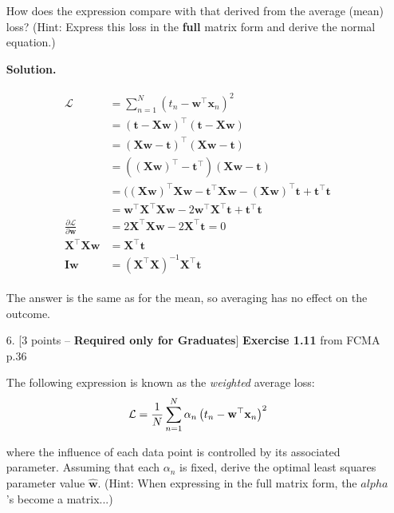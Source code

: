 \documentclass[10pt]{article}
\begin{document}
\begin{itemize}
How does the expression compare with that derived from the average (mean) loss?  (Hint: Express this loss in the {\bf full} matrix form and derive the normal equation.)

{\bf Solution.} 

\begin{eqnarray*}
\begin{aligned}
\mathcal{L} &= \sum_{n=1}^N \left( t_n - \mathbf{w}^\top \mathbf{x}_n \right)^2
\\
&= (\mathbf{t} - \mathbf{X} \mathbf{w})^\top (\mathbf{t} - \mathbf{X} \mathbf{w})
\\
&= (\mathbf{X} \mathbf{w} - \mathbf{t})^\top (\mathbf{X} \mathbf{w} - \mathbf{t})
\\
&= ((\mathbf{X} \mathbf{w})^\top - \mathbf{t}^\top) (\mathbf{X} \mathbf{w} - \mathbf{t})
\\
&= ((\mathbf{X} \mathbf{w})^\top \mathbf{X} \mathbf{w} 
 - \mathbf{t}^\top \mathbf{X} \mathbf{w} 
 - (\mathbf{X} \mathbf{w})^\top \mathbf{t}
 + \mathbf{t}^\top \mathbf{t}
\\
&= \mathbf{w}^\top \mathbf{X}^\top \mathbf{X} \mathbf{w} 
 - 2 \mathbf{w}^\top \mathbf{X}^\top \mathbf{t} 
 + \mathbf{t}^\top \mathbf{t}
\\
\frac { \partial \mathcal{L}} {\partial \mathbf{w}} &=
 2 \mathbf{X}^\top \mathbf{X} \mathbf{w} - 2 \mathbf{X}^\top \mathbf{t} = 0
\\
\mathbf{X}^\top \mathbf{X} \mathbf{w} &= \mathbf{X}^\top \mathbf{t}
\\
\mathbf{I} \mathbf{w} &= (\mathbf{X}^\top \mathbf{X})^{-1} \mathbf{X}^\top \mathbf{t}
\end{aligned}
\end{eqnarray*}

The answer is the same as for the mean, so averaging has no effect on the outcome.

\item[6.] [3 points -- {\bf Required only for Graduates}]
{\bf Exercise 1.11} from FCMA p.36

The following expression is known as the {\em weighted} average loss:
\begin{eqnarray*}
\mathcal{L} = {1 \over N} \sum_{n=1}^N \alpha_n \left( t_n - \mathbf{w}^\top \mathbf{x}_n \right)^2
\end{eqnarray*}

where the influence of each data point is controlled by its associated parameter.  Assuming that each $\alpha_n$ is fixed, derive the optimal least squares parameter value $\mathbf{\hat{w}}$.  (Hint: When expressing in the full matrix form, the $alpha$'s become a matrix...)


\end{itemize}
\end{document}
